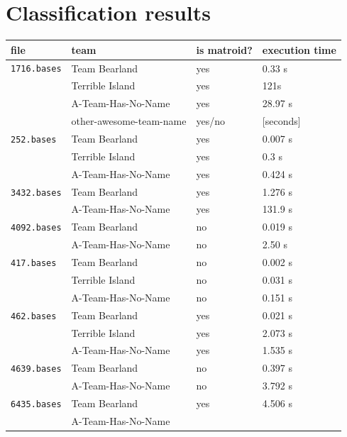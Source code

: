 \documentclass[11pt]{amsart}
\begin{document}
\section{Classification results}

\begin{center}
  \begin{tabular}[c]{llll}
    file
    & team
    & is matroid?
    & execution time
    \\\hline
    \texttt{1716.bases}
    & Team Bearland
    & yes
    & 0.33 s
    \\
    & Terrible Island
    & yes
    & 121s
    \\
    & A-Team-Has-No-Name
    & yes
    & 28.97 s
    \\
    & other-awesome-team-name
    & yes/no
    & [seconds]
    \\\hline
      \texttt{252.bases}
    & Team Bearland
    & yes
    & 0.007 s
    \\
    & Terrible Island
    & yes
    & 0.3 s
    \\
    & A-Team-Has-No-Name
    & yes
    & 0.424 s
    \\\hline
      \texttt{3432.bases}
    & Team Bearland
    & yes
    & 1.276 s
    \\
    & A-Team-Has-No-Name
    & yes
    & 131.9 s
    \\\hline
      \texttt{4092.bases}
    & Team Bearland
    & no
    & 0.019 s
    \\
    & A-Team-Has-No-Name
    & no
    & 2.50 s
    \\\hline
      \texttt{417.bases}
    & Team Bearland
    & no
    & 0.002 s
    \\
    & Terrible Island
    & no
    & 0.031 s
    \\
    & A-Team-Has-No-Name
    & no
    & 0.151 s
    \\\hline
      \texttt{462.bases}
    & Team Bearland
    & yes
    & 0.021 s
    \\
    & Terrible Island
    & yes
    & 2.073 s
    \\
    & A-Team-Has-No-Name
    & yes
    & 1.535 s
    \\\hline
      \texttt{4639.bases}
    & Team Bearland
    & no
    & 0.397 s
    \\
    & A-Team-Has-No-Name
    & no
    & 3.792 s
    \\\hline
    \texttt{6435.bases}
    & Team Bearland
    & yes
    & 4.506 s
    \\
    & A-Team-Has-No-Name

\end{tabular}
\end{center}
\end{document}
